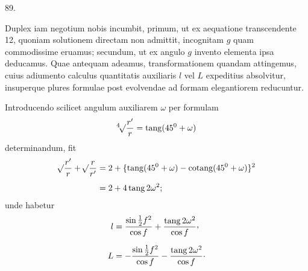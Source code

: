 \par{}\medskip
\hypertarget{native-120-article089}{}
\begin{center}89.\end{center}
Duplex iam negotium nobis incumbit, primum, ut ex aequatione transcendente 12, quoniam solutionem directam non admittit, incognitam $g$ quam commodissime eruamus; secundum, ut ex angulo $g$ invento elementa ipsa deducamus. Quae antequam adeamus, transformationem quandam attingemus, cuius adiumento calculus quantitatis auxiliaris $l$ vel $L$ expeditius absolvitur, insuperque plures formulae post evolvendae ad formam elegantiorem reducuntur.

Introducendo scilicet angulum auxiliarem $\omega$ per formulam
\[
\BareRoot[4]{\dfrac{r'}{r}}=\operatorname{tang}(45^0+\omega)
\]
determinandum, fit
\[
\begin{aligned}
\BareRoot{\dfrac{r'}{r}}+\BareRoot{\dfrac{r}{r'}}
&=2+\{\operatorname{tang}(45^0+\omega)-\operatorname{cotang}(45^0+\omega)\}^2\\[4pt]
&=2+4\operatorname{tang}2\omega^2;
\end{aligned}
\]
unde habetur
\[
\begin{aligned}
l&=\frac{\sin\tfrac12f^2}{\cos f}+\frac{\operatorname{tang}2\omega^2}{\cos f}\mathpunct{\raisebox{.45ex}{,}}\\[6pt]
L&=-\frac{\sin\tfrac12f^2}{\cos f}-\frac{\operatorname{tang}2\omega^2}{\cos f}\mathpunct{\cdot}
\end{aligned}
\]
